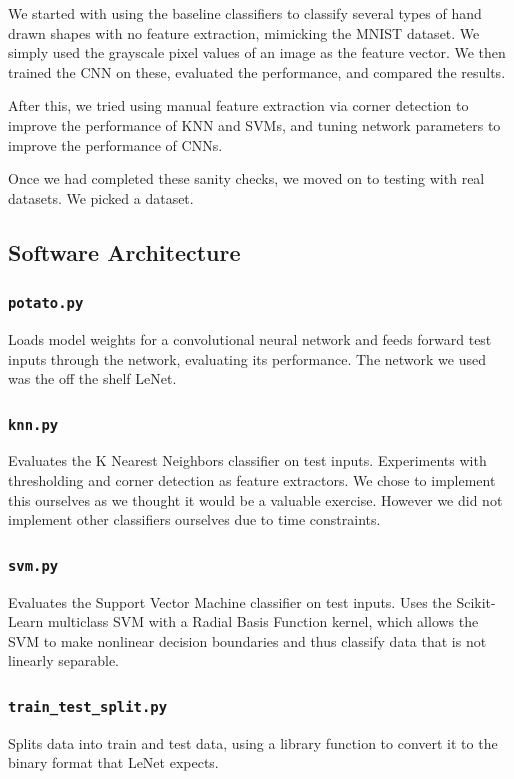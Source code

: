 \documentclass[leqno]{article}
\begin{document}
We started with using the baseline classifiers to classify several types of hand drawn shapes 
with no feature extraction, mimicking the MNIST dataset. We simply used the
grayscale pixel values of an image as the feature vector. We then trained the
CNN on these, evaluated the performance, and compared the results.

After this, we tried using manual feature extraction via corner detection to
improve the performance of KNN and SVMs, and tuning network parameters to
improve the performance of CNNs.

Once we had completed these sanity checks, we moved on to testing with real
datasets. We picked a dataset.


\subsection{Software Architecture}
\subsubsection{\texttt{potato.py}}
Loads model weights for a convolutional neural network and feeds
forward test inputs through the network, evaluating its performance. The network
we used was the off the shelf LeNet.
\subsubsection{\texttt{knn.py}}
Evaluates the K Nearest Neighbors classifier on test inputs. Experiments with
thresholding and corner detection as feature extractors. We chose to implement
this ourselves as we thought it would be a valuable exercise. However we did not
implement other classifiers ourselves due to time constraints. 

\subsubsection{\texttt{svm.py}}
Evaluates the Support Vector Machine classifier on test inputs. Uses the
Scikit-Learn multiclass SVM with a Radial Basis Function kernel, which allows
the SVM to make nonlinear decision boundaries and thus classify data that is not linearly separable.
\subsubsection{\texttt{train\_test\_split.py}}
Splits data into train and test data, using a library function to convert it to
the binary format that LeNet expects. 
\end{document}
